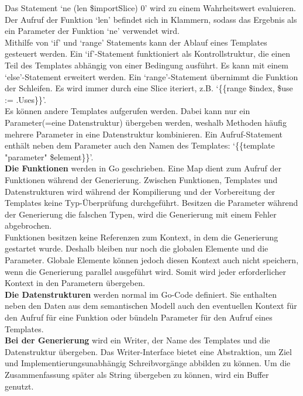 \documentclass[./einleitung.tex]{subfiles}
\begin{document}
    Das Statement `ne (len \$importSlice) 0' wird zu einem Wahrheitswert evaluieren.
    Der Aufruf der Funktion `len' befindet sich in Klammern, sodass das Ergebnis als ein Parameter der Funktion `ne' verwendet wird.\\
    Mithilfe von `if' und `range' Statements kann der Ablauf eines Templates gesteuert werden.
    Ein `if'-Statement funktioniert als Kontrollstruktur, die einen Teil des Templates abhängig von einer Bedingung ausführt.
    Es kann mit einem `else'-Statement erweitert werden.
    Ein `range'-Statement übernimmt die Funktion der Schleifen.
    Es wird immer durch eine Slice iteriert, z.B. `\{\{range \$index, \$use := .Uses\}\}'.\\
    Es können andere Templates aufgerufen werden.
    Dabei kann nur ein Parameter(=eine Datenstruktur) übergeben werden, weshalb Methoden häufig mehrere Parameter in eine Datenstruktur kombinieren.
    Ein Aufruf-Statement enthält neben dem Parameter auch den Namen des Templates: `\{\{template "parameter" \$element\}\}'.
    \\
    \textbf{Die Funktionen} werden in Go geschrieben.
    Eine Map dient zum Aufruf der Funktionen während der Generierung.
    Zwischen Funktionen, Templates und Datenstrukturen wird während der Kompilierung und der Vorbereitung der Templates keine Typ-Überprüfung durchgeführt.
    Besitzen die Parameter während der Generierung die falschen Typen, wird die Generierung mit einem Fehler abgebrochen.\\
    Funktionen besitzen keine Referenzen zum Kontext, in dem die Generierung gestartet wurde.
    Deshalb bleiben nur noch die globalen Elemente und die Parameter.
    Globale Elemente können jedoch diesen Kontext auch nicht speichern, wenn die Generierung parallel ausgeführt wird.
    Somit wird jeder erforderlicher Kontext in den Parametern übergeben.
    \\
    \textbf{Die Datenstrukturen} werden normal im Go-Code definiert.
    Sie enthalten neben den Daten aus dem semantischen Modell auch den eventuellen Kontext für den Aufruf für eine Funktion oder bündeln Parameter für den Aufruf eines Templates.
    \\
    \textbf{Bei der Generierung} wird ein Writer, der Name des Templates und die Datenstruktur übergeben.
    Das Writer-Interface bietet eine Abstraktion, um Ziel und Implementierungsunabhängig Schreibvorgänge abbilden zu können.
    Um die Zusammenfassung später als String übergeben zu können, wird ein Buffer genutzt.
    \\\\
\end{document}
